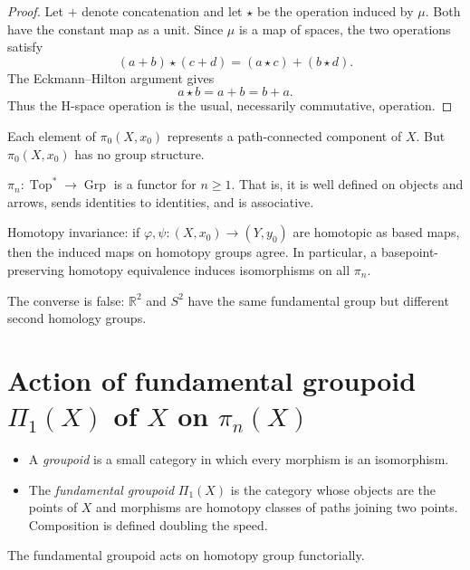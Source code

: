 \begin{proof}
Let $+$ denote concatenation and let
$\star$ be the operation induced by
$\mu$.  Both have the constant map as a
unit.  Since $\mu$ is a map of spaces,
the two operations satisfy
$$
(a+b)\star(c+d)
=
(a\star c)+(b\star d).
$$
The Eckmann--Hilton argument gives
$$
a\star b=a+b=b+a.
$$
Thus the H-space operation is the usual,
necessarily commutative, operation.
\end{proof}

\begin{remark}
Each element of $\pi_0(X,x_0)$ represents
a path-connected component of $X$.  But
$\pi_0(X,x_0)$ has no group structure.
\end{remark}
\begin{proposition}
$\pi_n:\operatorname{Top}^*
\longrightarrow\operatorname{Grp}$
is a functor for $n\geq1$. That is,
it is well defined on objects and
arrows, sends identities to identities,
and is associative.
\end{proposition}

\begin{proposition}
Homotopy invariance: if
$\varphi,\psi:(X,x_0)\to(Y,y_0)$
are homotopic as based maps, then the
induced maps on homotopy groups agree.
In particular, a basepoint-preserving
homotopy equivalence induces
isomorphisms on all $\pi_n$.
\end{proposition}

The converse is false: $\mathbb{R}^2$ and
$S^2$ have the same fundamental group
but different second homology groups.

\section{Action of fundamental groupoid
\texorpdfstring{$\Pi_1(X)$}{Π₁(X)} of
\texorpdfstring{$X$}{X} on
\texorpdfstring{$\pi_{n}(X)$}{π₁(X)}}
\label{section-actio-funda-group}

\begin{itemize}
\item A {\it groupoid} is a small category in
which every morphism is an isomorphism.
\item The {\it fundamental groupoid}
$\Pi_{1}(X)$
is the category whose objects
are the points of  $X$ and
morphisms are homotopy classes of paths
joining two points.
Composition is defined doubling the speed.
\end{itemize}

The fundamental groupoid acts on homotopy
group functorially.


